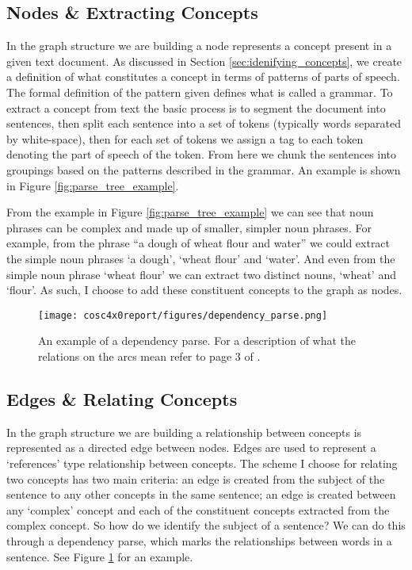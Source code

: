 \documentclass[12pt]{article}
\begin{document}
\subsection{Nodes \& Extracting Concepts}
In the graph structure we are building a node represents a concept present in a given text document. As discussed in Section \ref{sec:idenifying_concepts}, we create a definition of what constitutes a concept in terms of patterns of parts of speech. The formal definition of the pattern given defines what is called a grammar. To extract a concept from text the basic process is to segment the document into sentences, then split each sentence into a set of tokens (typically words separated by white-space), then for each set of tokens we assign a tag to each token denoting the part of speech of the token. From here we chunk the sentences into groupings based on the patterns described in the grammar. An example is shown in Figure \ref{fig:parse_tree_example}.

From the example in Figure \ref{fig:parse_tree_example} we can see that noun phrases can be complex and made up of smaller, simpler noun phrases. For example, from the phrase ``a dough of wheat flour and water'' we could extract the simple noun phrases `a dough', `wheat flour' and `water'. And even from the simple noun phrase `wheat flour' we can extract two distinct nouns, `wheat' and `flour'.  As such, I choose to add these constituent concepts to the graph as nodes.

\begin{figure}
    \centering
    \texttt{[image: cosc4x0report/figures/dependency\_parse.png]}
    \caption{An example of a dependency parse.\protect\footnotemark 
    For a description of what the relations on the arcs mean refer to page 3 of \citep{martin2009speech}.}
    \label{fig:dependency_parse_example}
\end{figure}

\subsection{Edges \& Relating Concepts}
In the graph structure we are building a relationship between concepts is represented as a directed edge between nodes. Edges are used to represent a `references' type relationship between concepts. The scheme I choose for relating two concepts has two main criteria: an edge is created from the subject of the sentence to any other concepts in the same sentence; an edge is created between any `complex' concept and each of the constituent concepts extracted from the complex concept. So how do we identify the subject of a sentence? We can do this through a dependency parse, which marks the relationships between words in a sentence. See Figure \ref{fig:dependency_parse_example} for an example. 
\end{document}
